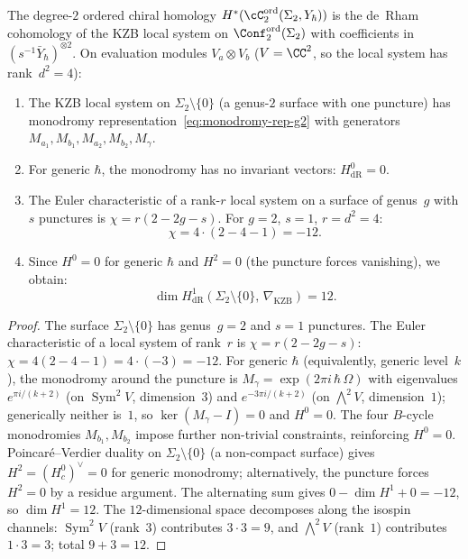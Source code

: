 \begin{proposition}
\label{prop:g2-degree2}
The degree-$2$ ordered chiral homology
$H^*(\cC_2^{\mathrm{ord}}(\Sigma_2, Y_\hbar))$ is the
de~Rham cohomology of the KZB local system on
$\Conf_2^{\mathrm{ord}}(\Sigma_2)$ with coefficients in
$(s^{-1}\bar{Y}_\hbar)^{\otimes 2}$.
On evaluation modules $V_a \otimes V_b$
\textup{(}$V = \CC^2$, so the local system has
rank~$d^2 = 4$\textup{)}:
\begin{enumerate}[label=\textup{(\roman*)}]
\item The KZB local system on
  $\Sigma_2 \setminus \{0\}$ \textup{(}a genus-$2$ surface
  with one puncture\textup{)} has monodromy
  representation~\eqref{eq:monodromy-rep-g2} with generators
  $M_{a_1}, M_{b_1}, M_{a_2}, M_{b_2}, M_\gamma$.
\item For generic $\hbar$, the monodromy has no invariant
  vectors: $H^0_{\mathrm{dR}} = 0$.
\item The Euler characteristic of a rank-$r$ local system on
  a surface of genus~$g$ with $s$ punctures is
  $\chi = r(2 - 2g - s)$. For $g = 2$, $s = 1$,
  $r = d^2 = 4$:
  \begin{equation}\label{eq:g2-degree2-euler}
    \chi = 4 \cdot (2 - 4 - 1) = -12.
  \end{equation}
\item Since $H^0 = 0$ for generic $\hbar$ and
  $H^2 = 0$ \textup{(}the puncture forces vanishing\textup{)},
  we obtain:
  \begin{equation}\label{eq:g2-degree2-h1}
    \dim H^1_{\mathrm{dR}}(\Sigma_2 \setminus \{0\},\,
    \nabla_{\mathrm{KZB}}) = 12.
  \end{equation}
\end{enumerate}
\end{proposition}

\begin{proof}
The surface $\Sigma_2 \setminus \{0\}$ has genus~$g = 2$ and
$s = 1$ punctures. The Euler characteristic of a local system
of rank~$r$ is $\chi = r(2 - 2g - s)$:
$\chi = 4(2 - 4 - 1) = 4 \cdot (-3) = -12$.
For generic $\hbar$ (equivalently, generic level~$k$), the
monodromy around the puncture is
$M_\gamma = \exp(2\pi i\,\hbar\,\Omega)$ with eigenvalues
$e^{\pi i/(k+2)}$ (on $\operatorname{Sym}^2 V$, dimension~$3$)
and $e^{-3\pi i/(k+2)}$ (on $\bigwedge^2 V$, dimension~$1$);
generically neither is~$1$, so
$\ker(M_\gamma - I) = 0$ and $H^0 = 0$.
The four $B$-cycle monodromies $M_{b_1}, M_{b_2}$ impose
further non-trivial constraints, reinforcing $H^0 = 0$.
Poincar\'e--Verdier duality on $\Sigma_2 \setminus \{0\}$
(a non-compact surface) gives
$H^2 = (H^0_c)^\vee = 0$ for generic
monodromy; alternatively, the puncture forces $H^2 = 0$ by
a residue argument.
The alternating sum gives
$0 - \dim H^1 + 0 = -12$, so $\dim H^1 = 12$.
The $12$-dimensional space decomposes along the isospin
channels:
$\operatorname{Sym}^2 V$ (rank~$3$) contributes
$3 \cdot 3 = 9$, and $\bigwedge^2 V$ (rank~$1$) contributes
$1 \cdot 3 = 3$; total $9 + 3 = 12$.
\end{proof}

